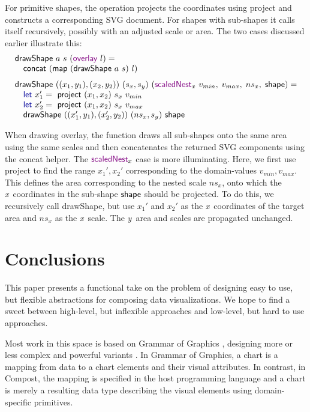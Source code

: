 \documentclass{jfp}
\newcommand{\X}{\emph{x}\ }
\newcommand{\Y}{\emph{y}\ }
\newcommand{\ident}[1]{\textnormal{\textcolor{idclr}{\sffamily #1}}}
\newcommand{\kvd}[1]{\textnormal{\textcolor{kvdclr}{\sffamily #1}}}
\newcommand{\fkvd}[1]{\textnormal{\textcolor{fkvdclr}{\sffamily #1}}}
\begin{document}
For primitive shapes, the operation projects the coordinates using \ident{project} and constructs
a corresponding SVG document. For shapes with sub-shapes it calls itself recursively, possibly
with an adjusted scale or area. The two cases discussed earlier illustrate this:
%
\begin{equation*}
\begin{array}{l}
\ident{drawShape}~a~s~(\kvd{overlay}~l) = \\
\quad\ident{concat}~(\ident{map}~(\ident{drawShape}~a~s)~l)\\
\\[-0.5em]
\ident{drawShape}~((x_1, y_1), (x_2, y_2))~(s_x, s_y)~(\kvd{scaledNest}_x~v_{min},\;v_{max},\;{ns}_x,\;\ident{shape}) = \\
\quad\fkvd{let}~x_1' = \ident{project}~(x_1, x_2)~s_x~v_{min}\\
\quad\fkvd{let}~x_2' = \ident{project}~(x_1, x_2)~s_x~v_{max}\\
\quad\ident{drawShape}~((x_1', y_1), (x_2', y_2))~({ns}_x, s_y)~\ident{shape}\\
\end{array}
\end{equation*}

\vspace{-0.5em}
\noindent
When drawing \kvd{overlay}, the function draws all sub-shapes onto the same
area using the same scales and then concatenates the returned SVG components using the \ident{concat} helper.
The $\kvd{scaledNest}_x$ case is more illuminating. Here, we first
use \ident{project} to find the range $x_1', x_2'$ corresponding to the domain-values
$v_{min},v_{max}$. This defines the area corresponding to the nested scale ${ns}_x$, onto
which the \X coordinates in the sub-shape $\ident{shape}$ should be projected.
To do this, we recursively call \ident{drawShape}, but use $x_1'$ and $x_2'$ as the \X coordinates
of the target area and ${ns}_x$ as the \X scale. The \Y area and scales are propagated unchanged.

\section{Conclusions}
This paper presents a functional take on the problem of designing easy to use, but flexible
abstractions for composing data visualizations. We hope to find a sweet between high-level, but
inflexible approaches and low-level, but hard to use approaches.

Most work in this space is based on Grammar of Graphics \cite{grammar}, designing more or less complex and
powerful variants \cite{layered,vega-lite,vega,polaris}. In Grammar of Graphics, a chart is a mapping from
data to a chart elements and their visual attributes. In contrast, in Compost, the mapping is
specified in the host programming language and a chart is merely a resulting data type
describing the visual elements using domain-specific primitives.
\end{document}
